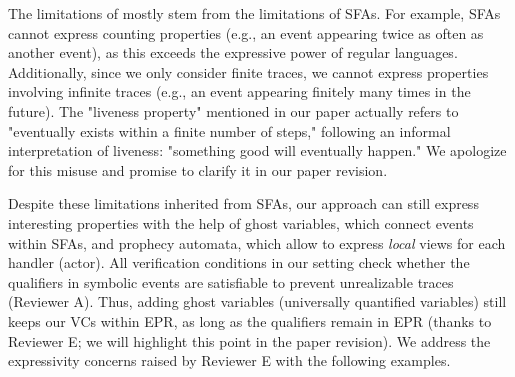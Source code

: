The limitations of \PAT mostly stem from the limitations of SFAs. For example, SFAs cannot express counting properties (e.g., an event appearing twice as often as another event), as this exceeds the expressive power of regular languages. Additionally, since we only consider finite traces, we cannot express properties involving infinite traces (e.g., an event appearing finitely many times in the future). The "liveness property" mentioned in our paper actually refers to "eventually exists within a finite number of steps," following an informal interpretation of liveness: "something good will eventually happen." We apologize for this misuse and promise to clarify it in our paper revision.

Despite these limitations inherited from SFAs, our approach can still express interesting properties with the help of ghost variables, which connect events within SFAs, and prophecy automata, which allow to express \emph{local} views for each handler (actor). All verification conditions in our setting check whether the qualifiers in symbolic events are satisfiable to prevent unrealizable traces (Reviewer A). Thus, adding ghost variables (universally quantified variables) still keeps our VCs within EPR, as long as the qualifiers remain in EPR (thanks to Reviewer E; we will highlight this point in the paper revision).  
We address the expressivity concerns raised by Reviewer E with the following examples.
